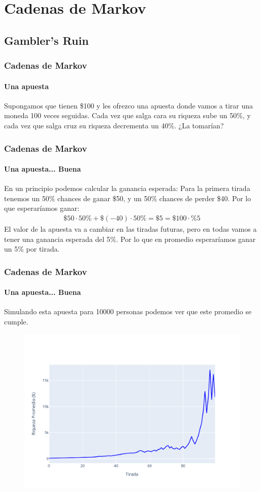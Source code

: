 \documentclass[../main.tex]{subfiles}
\begin{document}
\newcommand{\SECTIONC}{Cadenas de Markov}
\section{\SECTIONC}
\subsection{Gambler's Ruin}

\begin{frame}
  \frametitle{\SECTIONC}
  \framesubtitle{Una apuesta}

  Supongamos que tienen \$100 y les ofrezco una apuesta donde vamos a tirar una moneda 100 veces seguidas. Cada vez que salga cara su riqueza sube un 50\%, y cada vez que salga cruz su riqueza decrementa un 40\%. ¿La tomarían?
\end{frame}

\begin{frame}
  \frametitle{\SECTIONC}
  \framesubtitle{Una apuesta... Buena}

  En un principio podemos calcular la ganancia esperada: Para la primera tirada tenemos un 50\% chances de ganar \$50, y un 50\% chances de perder \$40. Por lo que esperaríamos ganar:
  \begin{gather*}
    \$50 \cdot 50\% + \$(-40) \cdot 50\% = \$5 = \$100 \cdot \%5
  \end{gather*}
  \pause El valor de la apuesta va a cambiar en las tiradas futuras, pero en todas vamos a tener una ganancia esperada del 5\%. Por lo que en promedio esperaríamos ganar un 5\% por tirada.
\end{frame}

\begin{frame}
  \frametitle{\SECTIONC}
  \framesubtitle{Una apuesta... Buena}

  Simulando esta apuesta para 10000 personas podemos ver que este promedio se cumple.

  \begin{figure}[H]
    \centering
    \includegraphics[scale=0.5]{img/mean.pdf}
  \end{figure}
\end{frame}
\end{document}

